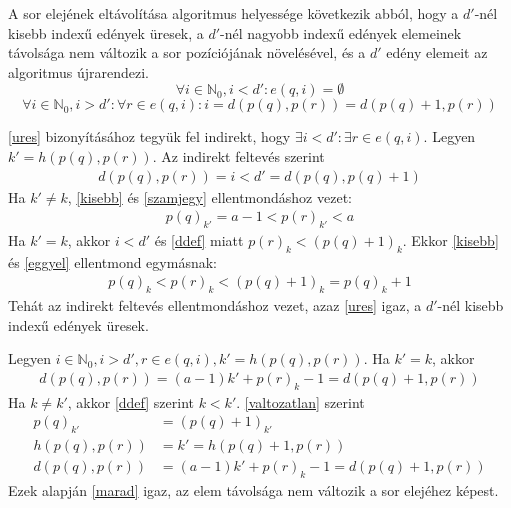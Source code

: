 A sor elejének eltávolítása algoritmus helyessége következik abból, hogy a $d'$-nél kisebb indexű edények üresek, a $d'$-nél nagyobb indexű edények elemeinek távolsága nem változik a sor pozíciójának növelésével, és a $d'$ edény elemeit az algoritmus újrarendezi.
\begin{equation}
\label{ures}
\forall i \in \mathbb{N}_0, i<d': e(q, i) = \emptyset
\end{equation}
\begin{equation}
\label{marad}
\forall i \in \mathbb{N}_0, i>d': \forall r \in e(q, i) : i = d(p(q), p(r)) = d(p(q)+1, p(r))
\end{equation}

\ref{ures} bizonyításához tegyük fel indirekt, hogy $\exists i < d': \exists r \in e(q, i)$.
Legyen $k'=h(p(q), p(r))$. Az indirekt feltevés szerint
\begin{align*}
d(p(q), p(r)) = i < d' = d(p(q), p(q)+1)
\end{align*}
Ha $k' \not = k$, \ref{kisebb} és \ref{szamjegy} ellentmondáshoz vezet:
\begin{align*}
p(q)_{k'} = a-1 < p(r)_{k'} < a
\end{align*}
Ha $k' = k$, akkor $i < d'$ és \ref{ddef} miatt $p(r)_k < (p(q)+1)_k$. Ekkor \ref{kisebb} és \ref{eggyel} ellentmond egymásnak:
\begin{align*}
p(q)_k < p(r)_k < (p(q)+1)_k = p(q)_k + 1
\end{align*}
Tehát az indirekt feltevés ellentmondáshoz vezet, azaz \ref{ures} igaz, a $d'$-nél kisebb indexű edények üresek.

Legyen $i \in \mathbb{N}_0, i>d', r \in e(q, i), k'=h(p(q), p(r))$. Ha $k' = k$, akkor
\begin{align*}
d(p(q), p(r)) = (a-1)k'+p(r)_k-1=d(p(q)+1, p(r))
\end{align*}
Ha $k \not = k'$, akkor \ref{ddef} szerint $k < k'$.
\ref{valtozatlan} szerint
\begin{align*}
p(q)_{k'} &= (p(q)+1)_{k'} \\
h(p(q), p(r)) &= k' = h(p(q)+1, p(r)) \\
d(p(q), p(r)) &= (a-1)k'+p(r)_k-1=d(p(q)+1, p(r))
\end{align*}
Ezek alapján \ref{marad} igaz, az elem távolsága nem változik a sor elejéhez képest.

